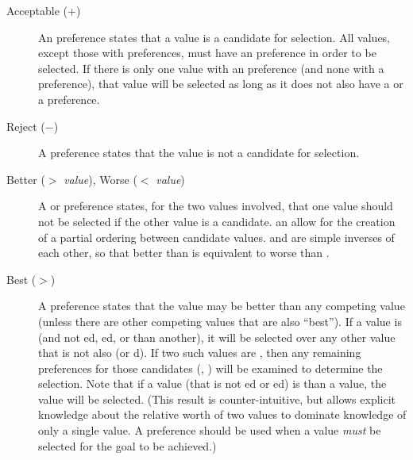 \begin{description}
\item [Acceptable (+)] 
	An  preference states that a value is a candidate for selection. All values, except those with  preferences, must have an  preference in order to be selected. If there is only one value with an  preference (and none with a  preference), that value will be selected as long as it does not also have a  or a  preference.
\vspace{-8pt}

\item [Reject ($-$)] 
	A  preference states that the value is not a candidate for selection.
\vspace{-8pt}

\item [Better ($>$ \emph{value}), Worse ($<$ \emph{value})] 
	A  or  preference states, for the two values involved, that one value should not be selected if the other value is a candidate.  an          allow for the creation of a partial ordering between candidate values.  and  are simple inverses of each other, so that  better than  is equivalent to  worse than .
\vspace{-8pt}

\item [Best ($>$)] 
	A  preference states that the value may be better than any competing value (unless there are other competing values that are also ``best''). If a value is  (and not ed, ed, or  than another), it will be selected over any other value that is not also  (or d). If two such values are , then any remaining preferences for those candidates (, ) will be examined to determine the selection. Note that if a value (that is not ed or ed) is  than a  value, the  value will be selected.  (This result is counter-intuitive, but allows explicit knowledge about the relative worth of two values to dominate knowledge of only a single value. A  preference should be used when a value \emph{must} be selected for the goal to be achieved.)
\vspace{-8pt}


\end{description}
